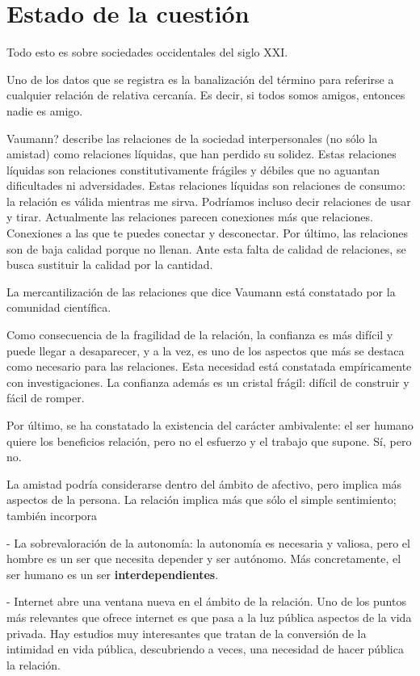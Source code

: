 \documentclass[palatino]{apuntesURJC}
\begin{document}
\section{Estado de la cuestión}

Todo esto es sobre sociedades occidentales del siglo XXI.

Uno de los datos que se registra es la banalización del término para referirse a cualquier relación de relativa cercanía. Es decir, si todos somos amigos, entonces nadie es amigo.

Vaumann? describe las relaciones de la sociedad interpersonales (no sólo la amistad) como relaciones líquidas, que han perdido su solidez.
%
Estas relaciones líquidas son relaciones constitutivamente frágiles y débiles que no aguantan dificultades ni adversidades.
%
Estas relaciones líquidas son relaciones de consumo: 
%
la relación es válida mientras me sirva. 
%
Podríamos incluso decir relaciones de usar y tirar.
%
Actualmente las relaciones parecen conexiones más que relaciones.
%
Conexiones a las que te puedes conectar y desconectar.
%
Por último, las relaciones son de baja calidad porque no llenan.
%
Ante esta falta de calidad de relaciones, se busca sustituir la calidad por la cantidad.

La mercantilización de las relaciones que dice Vaumann está constatado por la comunidad científica.

Como consecuencia de la fragilidad de la relación, la confianza es más difícil y puede llegar a desaparecer, y a la vez, es uno de los aspectos que más se destaca como necesario para las relaciones.
%
Esta necesidad está constatada empíricamente con investigaciones.
%
La confianza además es un cristal frágil: difícil de construir y fácil de romper.

Por último, se ha constatado la existencia del carácter ambivalente: el ser humano quiere los beneficios relación, pero no el esfuerzo y el trabajo que supone.
%
Sí, pero no.

La amistad podría considerarse dentro del ámbito de afectivo, pero implica más aspectos de la persona.
%
La relación implica más que sólo el simple sentimiento; también incorpora 

- La sobrevaloración de la autonomía: 
%
la autonomía es necesaria y valiosa, pero el hombre es un ser que necesita depender y ser autónomo. 
%
Más concretamente, el ser humano es un ser \textbf{interdependientes}. 

- Internet abre una ventana nueva en el ámbito de la relación.
%
Uno de los puntos más relevantes que ofrece internet es que pasa a la luz pública aspectos de la vida privada.
%
Hay estudios muy interesantes que tratan de la conversión de la intimidad en vida pública, descubriendo a veces, una necesidad de hacer pública la relación.
\end{document}
